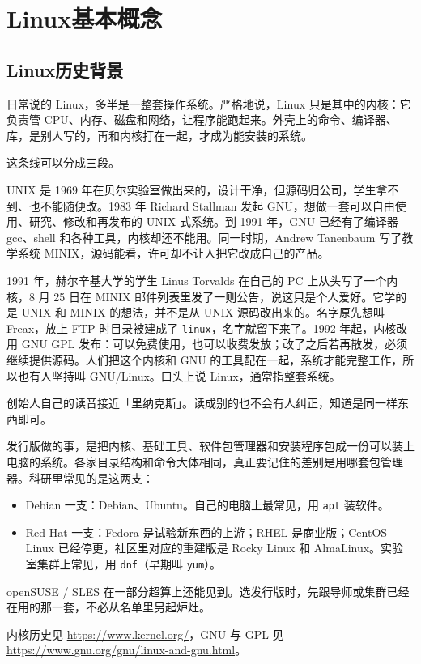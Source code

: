 \chapter{Linux基本概念}



\section{Linux历史背景}
日常说的 Linux，多半是一整套操作系统。严格地说，Linux 只是其中的内核：它负责管 CPU、内存、磁盘和网络，让程序能跑起来。外壳上的命令、编译器、库，是别人写的，再和内核打在一起，才成为能安装的系统。

这条线可以分成三段。

UNIX 是 1969 年在贝尔实验室做出来的，设计干净，但源码归公司，学生拿不到、也不能随便改。1983 年 Richard Stallman 发起 GNU，想做一套可以自由使用、研究、修改和再发布的 UNIX 式系统。到 1991 年，GNU 已经有了编译器 gcc、shell 和各种工具，内核却还不能用。同一时期，Andrew Tanenbaum 写了教学系统 MINIX，源码能看，许可却不让人把它改成自己的产品。

1991 年，赫尔辛基大学的学生 Linus Torvalds 在自己的 PC 上从头写了一个内核，8 月 25 日在 MINIX 邮件列表里发了一则公告，说这只是个人爱好。它学的是 UNIX 和 MINIX 的想法，并不是从 UNIX 源码改出来的。名字原先想叫 Freax，放上 FTP 时目录被建成了 \verb|linux|，名字就留下来了。1992 年起，内核改用 GNU GPL 发布：可以免费使用，也可以收费发放；改了之后若再散发，必须继续提供源码。人们把这个内核和 GNU 的工具配在一起，系统才能完整工作，所以也有人坚持叫 GNU/Linux。口头上说 Linux，通常指整套系统。

创始人自己的读音接近「里纳克斯」。读成别的也不会有人纠正，知道是同一样东西即可。

发行版做的事，是把内核、基础工具、软件包管理器和安装程序包成一份可以装上电脑的系统。各家目录结构和命令大体相同，真正要记住的差别是用哪套包管理器。科研里常见的是这两支：
\begin{itemize}
\item Debian 一支：Debian、Ubuntu。自己的电脑上最常见，用 \verb|apt| 装软件。
\item Red Hat 一支：Fedora 是试验新东西的上游；RHEL 是商业版；CentOS Linux 已经停更，社区里对应的重建版是 Rocky Linux 和 AlmaLinux。实验室集群上常见，用 \verb|dnf|（早期叫 \verb|yum|）。
\end{itemize}
openSUSE / SLES 在一部分超算上还能见到。选发行版时，先跟导师或集群已经在用的那一套，不必从名单里另起炉灶。

内核历史见 \url{https://www.kernel.org/}，GNU 与 GPL 见 \url{https://www.gnu.org/gnu/linux-and-gnu.html}。


